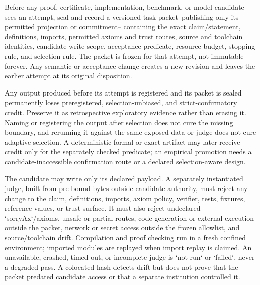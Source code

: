 \documentclass[11pt]{article}
\begin{document}
\begin{markdown}
Before any proof, certificate, implementation, benchmark, or model candidate sees an attempt,
seal and record a versioned task packet--publishing only its permitted projection or commitment--
containing the exact claim/statement, definitions, imports,
permitted axioms and trust routes, source and toolchain identities, candidate write scope,
acceptance predicate, resource budget, stopping rule, and selection rule. The packet is frozen for
that attempt, not immutable forever. Any semantic or acceptance change creates a new revision and
leaves the earlier attempt at its original disposition.

Any output produced before its attempt is registered and its packet is sealed permanently loses
preregistered, selection-unbiased, and strict-confirmatory credit. Preserve it as retrospective
exploratory evidence rather than erasing it. Naming or registering the output after selection does
not cure the missing boundary, and rerunning it against the same exposed data or judge does not cure
adaptive selection. A deterministic formal or exact artifact may later receive credit only for the
separately checked predicate; an empirical promotion needs a candidate-inaccessible confirmation
route or a declared selection-aware design.

The candidate may write only its declared payload. A separately instantiated judge, built from
pre-bound bytes outside candidate authority, must reject any change to the claim, definitions,
imports, axiom policy, verifier, tests, fixtures, reference values, or trust surface. It must also
reject undeclared `sorryAx`/axioms, unsafe or partial routes, code generation or external execution
outside the packet, network or secret access outside the frozen allowlist, and source/toolchain drift. Compilation and proof
checking run in a fresh confined environment; imported modules are replayed when import replay is
claimed. An unavailable, crashed, timed-out, or incomplete judge is `not-run` or `failed`, never a
degraded pass. A colocated hash detects drift but does not prove that the packet predated candidate
access or that a separate institution controlled it.


\end{markdown}
\end{document}
